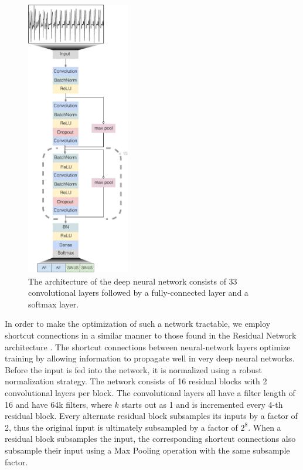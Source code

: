 \begin{figure}
\centering
\includegraphics[width=0.4\textwidth]{arrhythmias/figures/ecg_network_full.pdf}
\caption{The architecture of the deep neural network consists of 33
         convolutional layers followed by a fully-connected layer and
         a softmax layer.}
\label{fig:arrhythmias:net}
\end{figure}

In order to make the optimization of such a network tractable, we employ
shortcut connections in a similar manner to those found in the Residual Network
architecture \cite{he2016identity}. The shortcut connections between
neural-network layers optimize training by allowing information to propagate
well in very deep neural networks. Before the input is fed into the network, it
is normalized using a robust normalization strategy. The network consists of
16 residual blocks with 2 convolutional layers per block. The convolutional
layers all have a filter length of 16 and have 64k filters, where $k$
starts out as 1 and is incremented every 4-th residual block. Every
alternate residual block subsamples its inputs by a factor of 2, thus the
original input is ultimately subsampled by a factor of $2^8$. When a residual
block subsamples the input, the corresponding shortcut connections also
subsample their input using a Max Pooling operation with the same subsample
factor. 

